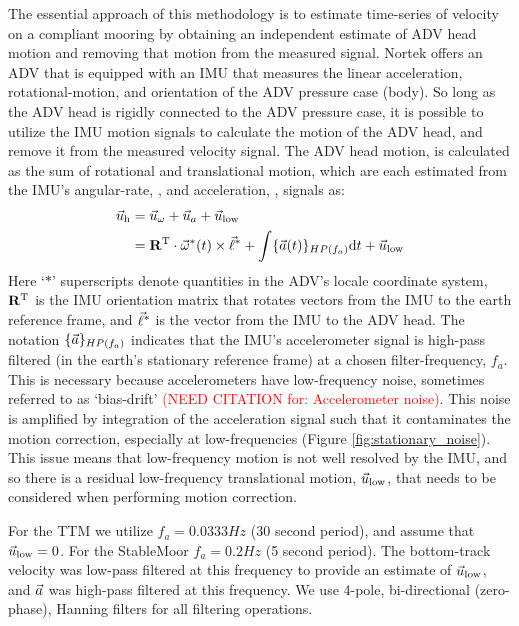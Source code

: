 \documentclass[twocol]{ametsoc}
\newcommand{\citeneeded}[1]{\textcolor{red}{(NEED CITATION for: #1)}}
\begin{document}
The essential approach of this methodology is to estimate time-series of velocity on a compliant mooring by obtaining an independent estimate of ADV head motion and removing that motion from the measured signal. Nortek offers an ADV that is equipped with an IMU that measures the linear acceleration, rotational-motion, and orientation of the ADV pressure case (body). So long as the ADV head is rigidly connected to the ADV pressure case, it is possible to utilize the IMU motion signals to calculate the motion of the ADV head, and remove it from the measured velocity signal.  The ADV head motion, is calculated as the sum of rotational and translational motion, which are each estimated from the IMU's angular-rate, \AngRt, and acceleration, \Accel, signals as:
\begin{align}
  \vec{u}_\mathrm{h} & = \vec{u}_\omega + \vec{u}_a + \vec{u}_\mathrm{low} \\
      & = \mathbf{R}^\mathrm{T} \cdot \vec{\omega}^*(t)\times\vec{\ell}^* + \int \{{\vec{a}}(t)\}_{HP(f_{a})} \mathrm{d}t + \vec{u}_\mathrm{low}
\end{align}
Here `$*$' superscripts denote quantities in the ADV's locale coordinate system, $\mathbf{R}^\mathrm{T}$ is the IMU orientation matrix that rotates vectors from the IMU to the earth reference frame, and $\vec{\ell}^*$ is the vector from the IMU to the ADV head. The notation $\{{\vec{a}}\}_{HP(f_a)}$ indicates that the IMU's accelerometer signal is high-pass filtered (in the earth's stationary reference frame) at a chosen filter-frequency, $f_a$. This is necessary because accelerometers have low-frequency noise, sometimes referred to as `bias-drift' \citeneeded{Accelerometer noise}. This noise is amplified by integration of the acceleration signal such that it contaminates the motion correction, especially at low-frequencies (Figure \ref{fig:stationary_noise}).  This issue means that low-frequency motion is not well resolved by the IMU, and so there is a residual low-frequency translational motion, $\vec{u}_\mathrm{low}$, that needs to be considered when performing motion correction.

For the TTM we utilize $f_a = 0.0333 Hz$ (30 second period), and assume that $\vec{u}_\mathrm{low} = 0$. For the StableMoor $f_a = 0.2 Hz$ (5 second period). The bottom-track velocity was  low-pass filtered at this frequency to provide an estimate of $\vec{u}_\mathrm{low}$, and ${\vec{a}}$ was high-pass filtered at this frequency. We use 4-pole, bi-directional (zero-phase), Hanning filters for all filtering operations. 


\end{document}
